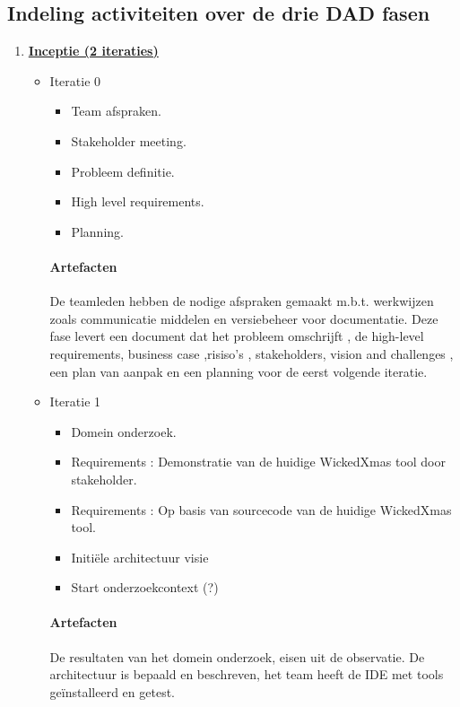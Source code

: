 
\subsection{Indeling activiteiten over de drie DAD fasen}
\begin{enumerate}
\item \underline{\textbf{Inceptie (2 iteraties)}}
		\begin{itemize}
		\item Iteratie 0
			\begin{itemize}
			\item Team afspraken.
			\item Stakeholder meeting.
			\item Probleem definitie.
			\item High level requirements.
			\item Planning.
			\end{itemize}
		\paragraph{Artefacten}
		De teamleden hebben de nodige afspraken gemaakt m.b.t. werkwijzen zoals
		communicatie middelen en versiebeheer voor documentatie. Deze fase levert
		een document dat het probleem omschrijft , de high-level requirements,
		business case ,risiso's , stakeholders, vision and challenges , een plan van
		aanpak en een planning voor de eerst volgende iteratie.
		\item Iteratie 1
			\begin{itemize}
			\item Domein onderzoek.
			\item Requirements : Demonstratie van de huidige WickedXmas tool door
			stakeholder.
			\item Requirements : Op basis van sourcecode van de huidige WickedXmas tool.
			\item Initi\"ele architectuur visie
			\item Start onderzoekcontext (?)
			\end{itemize}
		\paragraph{Artefacten}
		De resultaten van het domein onderzoek, eisen uit de observatie.
		De architectuur is bepaald en beschreven, het team heeft de IDE met tools
		ge\"{i}nstalleerd en getest.
		\end{itemize}



\end{enumerate}
